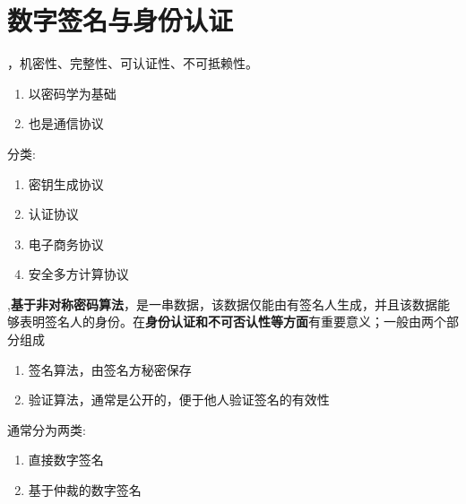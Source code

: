 \chapter{数字签名与身份认证}

，机密性、完整性、可认证性、不可抵赖性。

\begin{enumerate}
	\item 以密码学为基础
	\item 也是通信协议
\end{enumerate}
分类:
\begin{enumerate}
	\item 密钥生成协议
	\item 认证协议
	\item 电子商务协议
	\item 安全多方计算协议
\end{enumerate}

,\textbf{基于非对称密码算法}，是一串数据，该数据仅能由有签名人生成，并且该数据能够表明签名人的身份。在\textbf{身份认证和不可否认性等方面}有重要意义；一般由两个部分组成
\begin{enumerate}
	\item 签名算法，由签名方秘密保存
	\item 验证算法，通常是公开的，便于他人验证签名的有效性
\end{enumerate}
通常分为两类:
\begin{enumerate}
	\item 直接数字签名
	\item 基于仲裁的数字签名
\end{enumerate}

